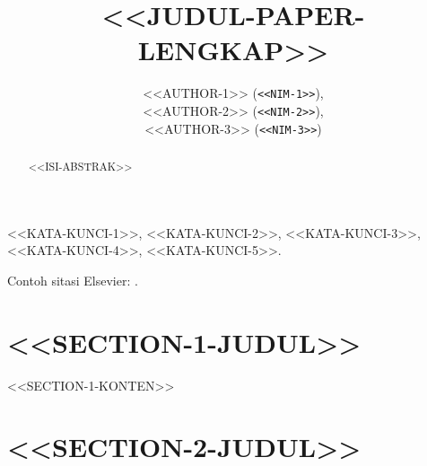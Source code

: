 \documentclass[preprint,12pt]{elsarticle}
\begin{document}
\begin{frontmatter}

\title{
<<JUDUL-PAPER-LENGKAP>>
}

\author{
<<AUTHOR-1>> (\texttt{<<NIM-1>>}), \\
<<AUTHOR-2>> (\texttt{<<NIM-2>>}), \\
<<AUTHOR-3>> (\texttt{<<NIM-3>>})
}

\address{
<<PROGRAM-STUDI>>, \\
<<FAKULTAS>>, \\
<<UNIVERSITAS>>, <<KOTA>>, Indonesia
}


\begin{abstract}
<<ISI-ABSTRAK>>
\end{abstract}

\begin{keyword}
<<KATA-KUNCI-1>>, <<KATA-KUNCI-2>>, <<KATA-KUNCI-3>>, <<KATA-KUNCI-4>>, <<KATA-KUNCI-5>>.
\end{keyword}

\end{frontmatter}

Contoh sitasi Elsevier: \cite{contoh_artikel_jurnal}.

\section{<<SECTION-1-JUDUL>>}

<<SECTION-1-KONTEN>>

\section{<<SECTION-2-JUDUL>>}
\end{document}
